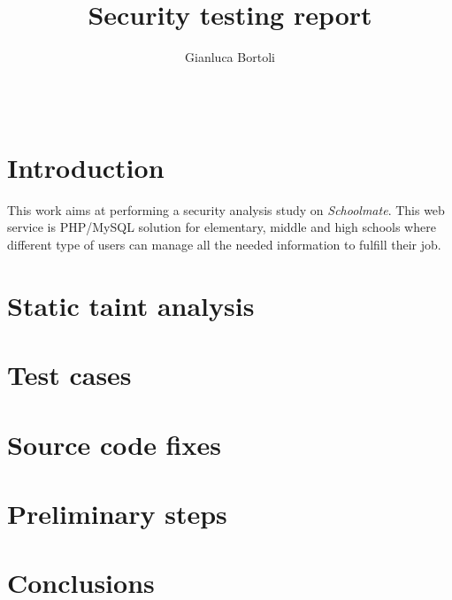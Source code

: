 \documentclass{sig-alternate-05-2015}
\begin{document}
\title{Security testing report}

\author{
    Gianluca Bortoli\\
           \\
           \\
}
\maketitle


\section{Introduction}
This work aims at performing a security analysis study on \emph{Schoolmate}.
This web service is PHP/MySQL solution for elementary,
middle and high schools where different type of users can manage all the needed
information to fulfill their job.

\section{Static taint analysis}

\section{Test cases}

\section{Source code fixes}

\section{Preliminary steps}

\section{Conclusions}


%

%

%
%
\end{document}

